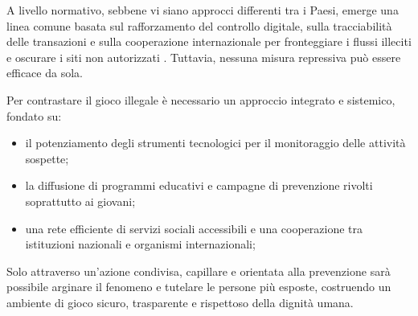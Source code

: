 \documentclass[a4paper,12pt]{article}
\begin{document}
A livello normativo, sebbene vi siano approcci differenti tra i Paesi, emerge una linea comune basata sul rafforzamento del controllo digitale, sulla tracciabilità delle transazioni e sulla cooperazione internazionale per fronteggiare i flussi illeciti e oscurare i siti non autorizzati \cite{banks2018taxonomy}. Tuttavia, nessuna misura repressiva può essere efficace da sola.

Per contrastare il gioco illegale è necessario un approccio integrato e sistemico, fondato su:

\begin{itemize}
\item il potenziamento degli strumenti tecnologici per il monitoraggio delle attività sospette;
\item la diffusione di programmi educativi e campagne di prevenzione rivolti soprattutto ai giovani;
\item una rete efficiente di servizi sociali accessibili e una cooperazione tra istituzioni nazionali e organismi internazionali;
\end{itemize}

Solo attraverso un’azione condivisa, capillare e orientata alla prevenzione sarà possibile arginare il fenomeno e tutelare le persone più esposte, costruendo un ambiente di gioco sicuro, trasparente e rispettoso della dignità umana.
\end{document}
